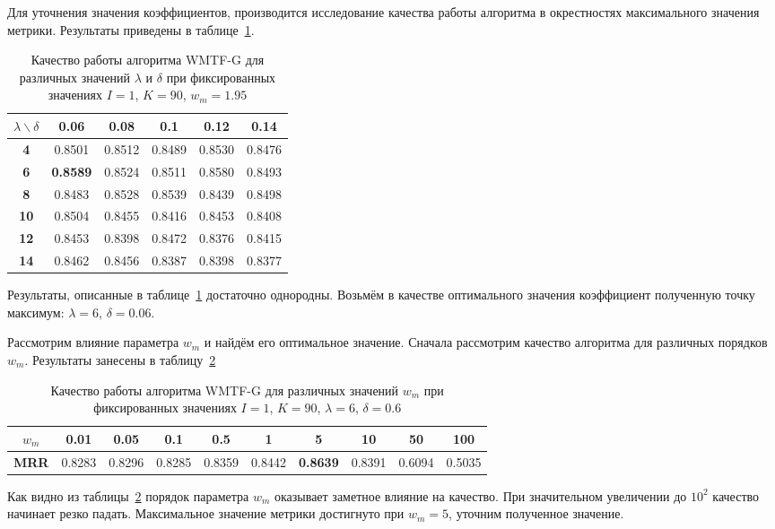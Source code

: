     Для уточнения значения коэффициентов, производится исследование качества работы алгоритма в окрестностях максимального значения метрики.
    Результаты приведены в таблице~\ref{tabular:wtmfg_test2}.
    \begin{table}[h!]
        \caption{Качество работы алгоритма WMTF-G для различных значений $\lambda$ и $\delta$ при фиксированных значениях $I=1$, $K=90$, $w_m=1.95$ \bigskip}
        \centering

        \label{tabular:wtmfg_test2}
        \begin{tabular}{|c|c|c|c|c|c|} \hline
            $\lambda \backslash \delta$ & \bf{0.06} & \bf{0.08} & \bf{0.1} & \bf{0.12} & \bf{0.14}  \\ \hline
            \bf{4}  & 0.8501 & 0.8512 & 0.8489 & 0.8530 & 0.8476  \\ \hline
            \bf{6}  & \bf{0.8589} & 0.8524 & 0.8511 & 0.8580 & 0.8493  \\ \hline
            \bf{8}  & 0.8483 & 0.8528 & 0.8539 & 0.8439 & 0.8498  \\ \hline
            \bf{10} & 0.8504 & 0.8455 & 0.8416 & 0.8453 & 0.8408  \\ \hline
            \bf{12} & 0.8453 & 0.8398 & 0.8472 & 0.8376 & 0.8415  \\ \hline
            \bf{14} & 0.8462 & 0.8456 & 0.8387 & 0.8398 & 0.8377  \\ \hline
        \end{tabular}
    \end{table}
    Результаты, описанные в таблице~\ref{tabular:wtmfg_test2} достаточно однородны. Возьмём в качестве оптимального значения коэффициент полученную точку максимум: $\lambda=6$, $\delta=0.06$.

    Рассмотрим влияние параметра $w_m$ и найдём его оптимальное значение. Сначала рассмотрим качество алгоритма для различных порядков $w_m$.
    Результаты занесены в таблицу~\ref{tabular:wtmfg_test3}
    \begin{table}[ht]
        \caption{Качество работы алгоритма WMTF-G для различных значений $w_m$ при фиксированных значениях $I=1$, $K=90$, $\lambda=6$, $\delta=0.6$ \bigskip}
        \centering

        \label{tabular:wtmfg_test3}
        \begin{tabular}{|c|c|c|c|c|c|c|c|c|c|} \hline
            $w_m$ & 0.01 & 0.05 & 0.1 & 0.5 & 1 & 5 & 10 & 50 & 100 \\ \hline
            \bf{MRR} & 0.8283 & 0.8296 & 0.8285 & 0.8359 & 0.8442 & \bf{0.8639} & 0.8391 & 0.6094 & 0.5035 \\ \hline

        \end{tabular}
    \end{table}
    Как видно из таблицы~\ref{tabular:wtmfg_test3} порядок параметра $w_m$ оказывает заметное влияние на качество. При значительном увеличении до $10^2$ качество начинает резко падать.
    Максимальное значение метрики достигнуто при $w_m=5$, уточним полученное значение.

